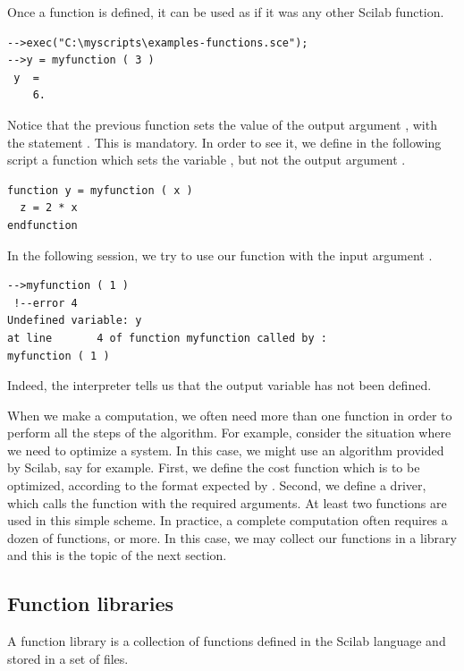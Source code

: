 Once a function is defined, it can be used as if it was any other
Scilab function.
\lstset{language=scilabscript}
\begin{lstlisting}
-->exec("C:\myscripts\examples-functions.sce");
-->y = myfunction ( 3 )
 y  =
    6.  
\end{lstlisting}

Notice that the previous function sets the value of the output 
argument , with the statement . 
This is mandatory. In order to see it,  
we define in the following script a function which sets the 
variable , but not the output argument .
\lstset{language=scilabscript}
\begin{lstlisting}
function y = myfunction ( x )
  z = 2 * x
endfunction
\end{lstlisting}
In the following session, we try to use our function with the 
input argument .
\lstset{language=scilabscript}
\begin{lstlisting}
-->myfunction ( 1 )
 !--error 4 
Undefined variable: y
at line       4 of function myfunction called by :  
myfunction ( 1 )
\end{lstlisting}
Indeed, the interpreter tells us that the output variable 
 has not been defined. 

When we make a computation, we often need more than one function in order to 
perform all the steps of the algorithm. For example, consider the situation where 
we need to optimize a system. In this case, we might use an algorithm provided 
by Scilab, say  for example. First, we define the cost function which 
is to be optimized, according to the format expected by . Second, 
we define a driver, which calls the  function with the 
required arguments. At least two functions are used in this simple scheme. 
In practice, a complete computation often requires a dozen of functions, or more.
In this case, we may collect our functions in a library and this is the topic 
of the next section.

\subsection{Function libraries}
\label{introscilab-funlibrary}

A function library is a collection of functions defined in the 
Scilab language and stored in a set of files.

